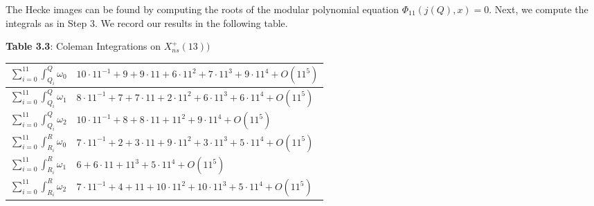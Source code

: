 \begin{itemize}
The Hecke images can be found by computing the roots of the modular polynomial
equation $\Phi_{11}(j(Q),x) = 0$. Next, we compute the integrals as in Step 3. We record our results in the following table.

    \begin{center}
    \textbf{Table 3.3}: Coleman Integrations on $X_{ns}^+(13))$
    \end{center}

\begin{table}[h]
\label{table:X_{ns}_13}

    \centering
    \begin{tabular}{|l|l|}
    
    \hline
    \rule{0pt}{4ex}    
        $\sum_{i=0}^{11}\int^Q_{Q_i} \omega_0 $    & $10\cdot 11^{-1} + 9 + 9\cdot 11  + 6 \cdot 11^2 + 7\cdot 11^3 + 9\cdot 11^4 + O(11^5)$ 
            \rule{0pt}{4ex} \\
    
    \hline 
    \rule{0pt}{4ex}
    $\sum_{i=0}^{11}\int^Q_{Q_i} \omega_1 $ & $8\cdot 11^{-1} + 7 + 7\cdot 11 + 2 \cdot 11^2 + 6\cdot 11^3 + 6\cdot 11^4 + O(11^5)$
\\\hline

    \rule{0pt}{4ex}
    $\sum_{i=0}^{11}\int^Q_{Q_i} \omega_2 $ & $10\cdot 11^{-1} + 8 + 8\cdot 11 + 11^2  + 9\cdot 11^4 + O(11^5)$
\\\hline

    \rule{0pt}{4ex}
    $\sum_{i=0}^{11}\int^R_{R_i} \omega_0 $ & $7\cdot 11^{-1} + 2 + 3\cdot 11 + 9 \cdot 11^2  + 3\cdot 11^3 + 5\cdot 11^4 + O(11^5) $
\\\hline

    \rule{0pt}{4ex}
    $\sum_{i=0}^{11}\int^R_{R_i} \omega_1 $ & $6 + 6\cdot 11 + 11^3 + 5\cdot 11^4 + O(11^5)$ 
\\\hline

    \rule{0pt}{4ex}
    $\sum_{i=0}^{11}\int^R_{R_i} \omega_2 $ & $7\cdot 11^{-1} + 4 + 11 + 10 \cdot 11^2 +  10\cdot 11^3 + 5\cdot 11^4 + O(11^5)$ 
\\\hline
    \end{tabular}

    \label{table:X_{ns}^+(13)_results}
\end{table}

\end{itemize}
        